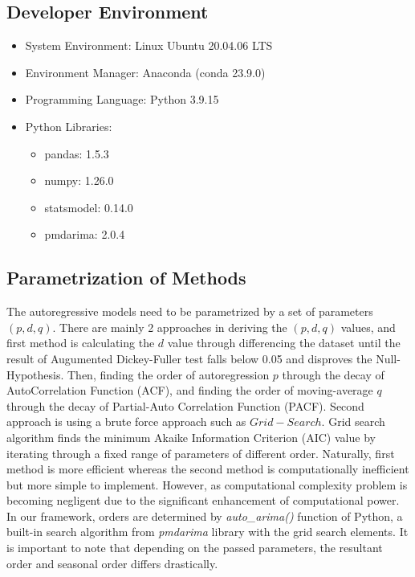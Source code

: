 \documentclass[]{usiinfbachelorproject}
\begin{document}
\subsection{Developer Environment}
\begin{itemize}
 \item System Environment: Linux Ubuntu 20.04.06 LTS
 \item Environment Manager: Anaconda (conda 23.9.0)
 \item Programming Language: Python 3.9.15
 \item Python Libraries: 
 \begin{itemize}
    \item pandas: 1.5.3
    \item numpy: 1.26.0
    \item statsmodel: 0.14.0
    \item pmdarima: 2.0.4
 \end{itemize}
\end{itemize}

\subsection{Parametrization of Methods}
The autoregressive models need to be parametrized by a set of parameters ${(p, d, q)}$. There are mainly 2 approaches in deriving the ${(p,d,q)}$ values, and first method is calculating the $d$ value through differencing the dataset until the result of Augumented Dickey-Fuller test falls below 0.05 and disproves the Null-Hypothesis.
Then, finding the order of autoregression $p$ through the decay
of AutoCorrelation Function (ACF), and finding the order of moving-average $q$ through the decay of Partial-Auto Correlation Function (PACF). Second approach is using a brute force approach such as $Grid-Search$. Grid search algorithm finds the minimum Akaike Information Criterion (AIC) value by iterating through a fixed range of parameters of different order. Naturally, first method is more efficient whereas the second method is computationally inefficient but more simple to implement. However, as computational complexity problem is becoming negligent due to the significant enhancement of computational power. In our framework, orders are determined by \textit{auto\_arima()} function of Python, a built-in search algorithm from \textit{pmdarima} library with the grid search elements. It is important to note that depending on the passed parameters, the resultant order and seasonal order differs drastically. \\
\end{document}
